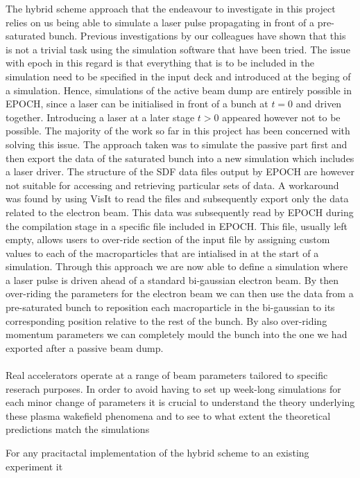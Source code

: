 \begin{itemize}
The hybrid scheme approach that the endeavour to investigate in this project relies on us being able to simulate a laser pulse propagating in front of a pre-saturated bunch. Previous investigations by our colleagues have shown that this is not a trivial task using the simulation software that have been tried. The issue with epoch in this regard is that everything that is to be included in the simulation need to be specified in the input deck and introduced at the beging of a simulation. Hence, simulations of the active beam dump are entirely possible in EPOCH, since a laser can be initialised in front of a bunch at $t=0$ and driven together. Introducing a laser at a later stage $t>0$ appeared however not to be possible. The majority of the work so far in this project has been concerned with solving this issue. The approach taken was to simulate the passive part first and then export the data of the saturated bunch into a new simulation which includes a laser driver. The structure of the SDF data files output by EPOCH are however not suitable for accessing and retrieving particular sets of data. A workaround was found by using VisIt to read the files and subsequently export only the data related to the electron beam. This data was subsequently read by EPOCH during the compilation stage in a specific file included in EPOCH. This file, usually left empty, allows users to over-ride section of the input file by assigning custom values to each of the macroparticles that are intialised in at the start of a simulation. Through this approach we are now able to define a simulation where a laser pulse is driven ahead of a standard bi-gaussian electron beam. By then over-riding the parameters for the electron beam we can then use the data from a pre-saturated bunch to reposition each macroparticle in the bi-gaussian to its corresponding position relative to the rest of the bunch. By also over-riding momentum parameters we can completely mould the bunch into the one we had exported after a passive beam dump. \\
\\
Real accelerators operate at a range of beam parameters tailored to specific reserach purposes. In order to avoid having to set up week-long simulations for each minor change of parameters it is crucial to understand the theory underlying these plasma wakefield phenomena and to see to what extent the theoretical predictions match the simulations

For any pracitactal implementation of the hybrid scheme to an existing experiment it 



\end{itemize}
